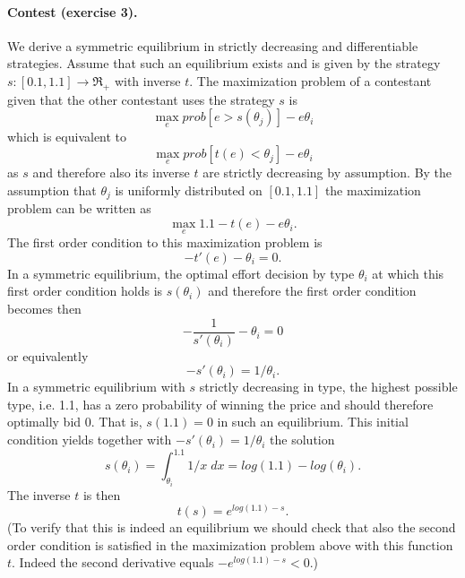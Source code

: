 \documentclass[a4paper,11pt]{article}
\begin{document}
\paragraph{Contest (exercise 3).} We derive a symmetric equilibrium in strictly decreasing and differentiable strategies. Assume that such an equilibrium exists and is given by the strategy $s:[0.1,1.1]\rightarrow \Re_+$ with inverse $t$. The maximization problem of a contestant given that the other contestant uses the strategy $s$ is
\begin{equation*}
  \max_e prob[e>s(\theta _j)]-e\theta _i
\end{equation*}
which is equivalent to 
\begin{equation*}
  \max_e prob[t(e)<\theta _j]-e\theta _i
\end{equation*}
as $s$ and therefore also its inverse $t$ are strictly decreasing by assumption. By the assumption that $\theta _j$ is uniformly distributed on $[0.1,1.1]$ the maximization problem can be written as
\begin{equation*}
  \max_e 1.1-t(e)-e\theta _i.
\end{equation*}
The first order condition to this maximization problem is
\begin{equation*}
  -t'(e)-\theta _i=0.
\end{equation*}
In a symmetric equilibrium, the optimal effort decision by type $\theta _i$ at which this first order condition holds is $s(\theta _i)$ and therefore the first order condition becomes then
\begin{equation*}
  -\frac{1}{s'(\theta _i)}-\theta _i=0
\end{equation*}
or equivalently
\begin{equation*}
  -s'(\theta _i)=1/\theta _i.
\end{equation*}
In a symmetric equilibrium with $s$ strictly decreasing in type, the highest possible type, i.e. 1.1, has a zero probability of winning the price and should therefore optimally bid 0. That is, $s(1.1)=0$ in such an equilibrium. This initial condition yields together with $-s'(\theta _i)=1/\theta _i$ the solution
\begin{equation*}
  s(\theta _i)=\int_{\theta _i}^{1.1}1/x \;dx=log(1.1)-log(\theta _i).
\end{equation*}
The inverse $t$ is then
\begin{equation*}
t(s)=e^{log(1.1)-s}.
\end{equation*}
(To verify that this is indeed an equilibrium we should check that also the second order condition is satisfied in the maximization problem above with this function $t$. Indeed the second derivative equals $-e^{log(1.1)-s}<0$.)
\end{document}
